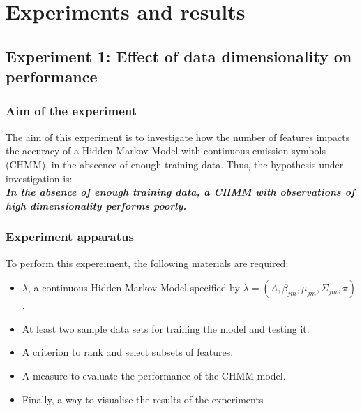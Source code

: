 \chapter{Experiments and results} \label{sec:results}

\section{Experiment 1: Effect of data dimensionality on performance} \label{exp:feat-size}

\subsection{Aim of the experiment}
The aim of this experiment is to investigate how the number of features impacts the accuracy of a Hidden Markov Model with continuous emission symbols (CHMM), in the abscence of enough training data. Thus, the hypothesis under investigation is:\\
\textbf{\textit{In the absence of enough training data, a CHMM with observations of high dimensionality performs poorly.}}

\subsection{Experiment apparatus}
To perform this expereiment, the following materials are required:
\begin{itemize}
	\item \(\lambda\), a continuous Hidden Markov Model specified by \(\lambda = (A, \beta_{jm}, \mu_{jm}, \Sigma_{jm}, \pi)\).
	\item At least two sample data sets for training the model and testing it.
	\item A criterion to rank and select subsets of features.
	\item A measure to evaluate the performance of the CHMM model.
	\item Finally, a way to visualise the results of the experiments
\end{itemize}

